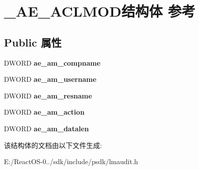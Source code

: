 \hypertarget{struct___a_e___a_c_l_m_o_d}{}\section{\+\_\+\+A\+E\+\_\+\+A\+C\+L\+M\+O\+D结构体 参考}
\label{struct___a_e___a_c_l_m_o_d}
\subsection*{Public 属性}
\begin{DoxyCompactItemize}
\item 
\mbox{\label{struct___a_e___a_c_l_m_o_d_a2bccba7f39bbb7bdc2756ed1d65c798e}} 
D\+W\+O\+RD {\bfseries ae\+\_\+am\+\_\+compname}
\item 
\mbox{\label{struct___a_e___a_c_l_m_o_d_ae7e8ed5dba49991222bb3b129184598e}} 
D\+W\+O\+RD {\bfseries ae\+\_\+am\+\_\+username}
\item 
\mbox{\label{struct___a_e___a_c_l_m_o_d_a1bd49c709ae329d99f3d28434d2641a9}} 
D\+W\+O\+RD {\bfseries ae\+\_\+am\+\_\+resname}
\item 
\mbox{\label{struct___a_e___a_c_l_m_o_d_a8109438da04f672c2b4a1ad949b404bc}} 
D\+W\+O\+RD {\bfseries ae\+\_\+am\+\_\+action}
\item 
\mbox{\label{struct___a_e___a_c_l_m_o_d_ade152f9625d7bff221461bb4a641e3fe}} 
D\+W\+O\+RD {\bfseries ae\+\_\+am\+\_\+datalen}
\end{DoxyCompactItemize}


该结构体的文档由以下文件生成\+:\begin{DoxyCompactItemize}
\item 
E\+:/\+React\+O\+S-\/0../sdk/include/psdk/lmaudit.\+h\end{DoxyCompactItemize}
